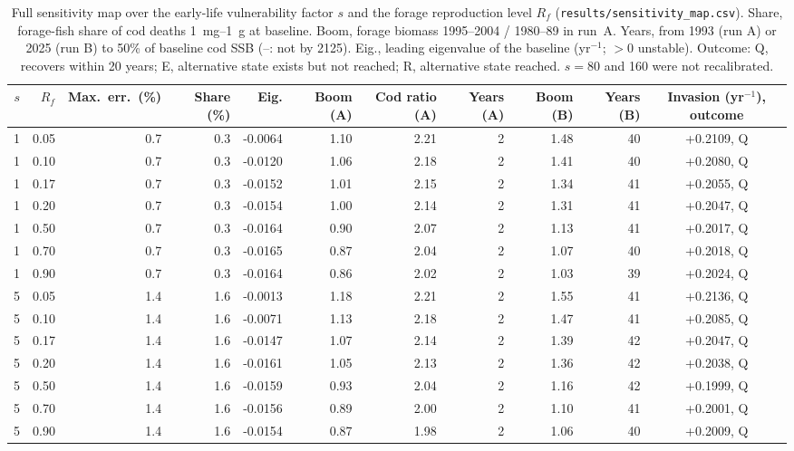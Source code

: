 \documentclass[11pt,letterpaper,fleqn]{article}
\newcommand{\yr}{yr$^{-1}$}
\begin{document}
\begin{table}[p]\caption{Full sensitivity map over the early-life vulnerability factor $s$ and the forage reproduction level $R_f$ (\nolinkurl{results/sensitivity_map.csv}). Share, forage-fish share of cod deaths 1~mg--1~g at baseline. Boom, forage biomass 1995--2004 / 1980--89 in run~A. Years, from 1993 (run A) or 2025 (run B) to 50\% of baseline cod SSB (--: not by 2125). Eig., leading eigenvalue of the baseline (\yr{}; $>0$ unstable). Outcome: Q, recovers within 20 years; E, alternative state exists but not reached; R, alternative state reached. $s=80$ and 160 were not recalibrated.}\label{tab:S-map}
\centering\scriptsize\begin{adjustbox}{max width=\textwidth}\begin{tabular}{@{}rrrrrrrrrrc@{}}\toprule
$s$ & $R_f$ & Max.\ err.\ (\%) & Share (\%) & Eig. & Boom (A) & Cod ratio (A) & Years (A) & Boom (B) & Years (B) & Invasion (\yr), outcome\\\midrule
1 & 0.05 & 0.7 & 0.3 & -0.0064 & 1.10 & 2.21 & 2 & 1.48 & 40 & +0.2109, Q\\
1 & 0.10 & 0.7 & 0.3 & -0.0120 & 1.06 & 2.18 & 2 & 1.41 & 40 & +0.2080, Q\\
1 & 0.17 & 0.7 & 0.3 & -0.0152 & 1.01 & 2.15 & 2 & 1.34 & 41 & +0.2055, Q\\
1 & 0.20 & 0.7 & 0.3 & -0.0154 & 1.00 & 2.14 & 2 & 1.31 & 41 & +0.2047, Q\\
1 & 0.50 & 0.7 & 0.3 & -0.0164 & 0.90 & 2.07 & 2 & 1.13 & 41 & +0.2017, Q\\
1 & 0.70 & 0.7 & 0.3 & -0.0165 & 0.87 & 2.04 & 2 & 1.07 & 40 & +0.2018, Q\\
1 & 0.90 & 0.7 & 0.3 & -0.0164 & 0.86 & 2.02 & 2 & 1.03 & 39 & +0.2024, Q\\
5 & 0.05 & 1.4 & 1.6 & -0.0013 & 1.18 & 2.21 & 2 & 1.55 & 41 & +0.2136, Q\\
5 & 0.10 & 1.4 & 1.6 & -0.0071 & 1.13 & 2.18 & 2 & 1.47 & 41 & +0.2085, Q\\
5 & 0.17 & 1.4 & 1.6 & -0.0147 & 1.07 & 2.14 & 2 & 1.39 & 42 & +0.2047, Q\\
5 & 0.20 & 1.4 & 1.6 & -0.0161 & 1.05 & 2.13 & 2 & 1.36 & 42 & +0.2038, Q\\
5 & 0.50 & 1.4 & 1.6 & -0.0159 & 0.93 & 2.04 & 2 & 1.16 & 42 & +0.1999, Q\\
5 & 0.70 & 1.4 & 1.6 & -0.0156 & 0.89 & 2.00 & 2 & 1.10 & 41 & +0.2001, Q\\
5 & 0.90 & 1.4 & 1.6 & -0.0154 & 0.87 & 1.98 & 2 & 1.06 & 40 & +0.2009, Q\\

\end{tabular}
\end{adjustbox}
\end{table}
\end{document}
